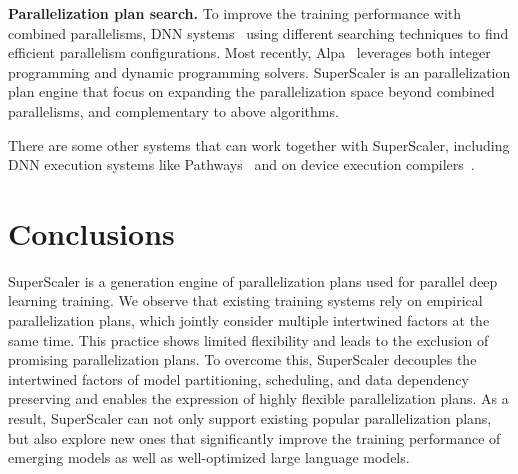 {\bf  Parallelization plan search. } To improve the training performance with combined parallelisms, DNN systems~\cite{alpa, piper, tofu, flexflow, pesto, autosync, paddlepaddle} using different searching techniques to find efficient parallelism configurations. Most recently, Alpa~\cite{alpa} leverages both integer programming and dynamic programming solvers. {SuperScaler} is an parallelization plan engine that focus on expanding the parallelization space beyond combined parallelisms, and complementary to above algorithms.

There are some other systems that can work together with {SuperScaler}, including DNN execution systems like Pathways~\cite{pathways} and on device execution compilers~\cite{tvm, rammer,xla}.

\section{Conclusions}
\label{sec:conclude}

{SuperScaler} is a generation engine of parallelization plans used for parallel deep learning training. We observe that existing training systems rely on empirical parallelization plans, which jointly consider multiple intertwined factors at the same time. This practice shows limited flexibility and leads to the exclusion of promising parallelization plans. To overcome this, {SuperScaler} decouples the intertwined factors of model partitioning, scheduling, and data dependency preserving and enables the expression of highly flexible parallelization plans. As a result, {SuperScaler} can not only support existing popular parallelization plans, but also explore new ones that significantly improve the training performance of emerging models as well as well-optimized large language models.  


